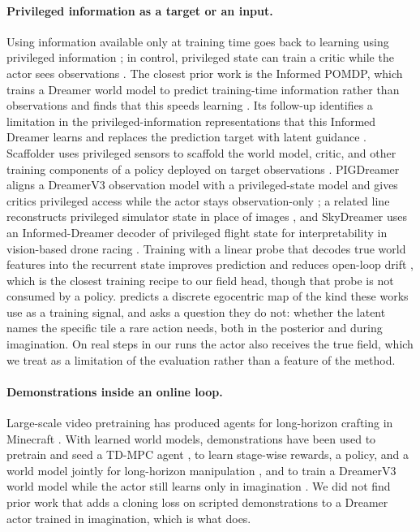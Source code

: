 \paragraph{Privileged information as a target or an input.}
Using information available only at training time goes back to learning using privileged information \citep{vapnik2009lupi}; in control, privileged state can train a critic while the actor sees observations \citep{pinto2018asymmetric}.
The closest prior work is the Informed POMDP, which trains a Dreamer world model to predict training-time information rather than observations and finds that this speeds learning \citep{lambrechts2024informed}. Its follow-up identifies a limitation in the privileged-information representations that this Informed Dreamer learns and replaces the prediction target with latent guidance \citep{lambrechts2026reinformed}.
Scaffolder uses privileged sensors to scaffold the world model, critic, and other training components of a policy deployed on target observations \citep{hu2024scaffolder}.
PIGDreamer aligns a DreamerV3 observation model with a privileged-state model and gives critics privileged access while the actor stays observation-only \citep{huang2025pigdreamer}; a related line reconstructs privileged simulator state in place of images \citep{krinner2025ssmwm}, and SkyDreamer uses an Informed-Dreamer decoder of privileged flight state for interpretability in vision-based drone racing \citep{verraest2025skydreamer}.
Training with a linear probe that decodes true world features into the recurrent state improves prediction and reduces open-loop drift \citep{zahorodnii2025probes}, which is the closest training recipe to our field head, though that probe is not consumed by a policy.
\method{} predicts a discrete egocentric map of the kind these works use as a training signal, and asks a question they do not: whether the latent names the specific tile a rare action needs, both in the posterior and during imagination.
On real steps in our runs the actor also receives the true field, which we treat as a limitation of the evaluation rather than a feature of the method.

\paragraph{Demonstrations inside an online loop.}
Large-scale video pretraining has produced agents for long-horizon crafting in Minecraft \citep{baker2022vpt}.
With learned world models, demonstrations have been used to pretrain and seed a TD-MPC agent \citep{hansen2023modem}, to learn stage-wise rewards, a policy, and a world model jointly for long-horizon manipulation \citep{escoriza2025demo3}, and to train a DreamerV3 world model while the actor still learns only in imagination \citep{staley2024wmhd}.
We did not find prior work that adds a cloning loss on scripted demonstrations to a Dreamer actor trained in imagination, which is what \method{} does.

